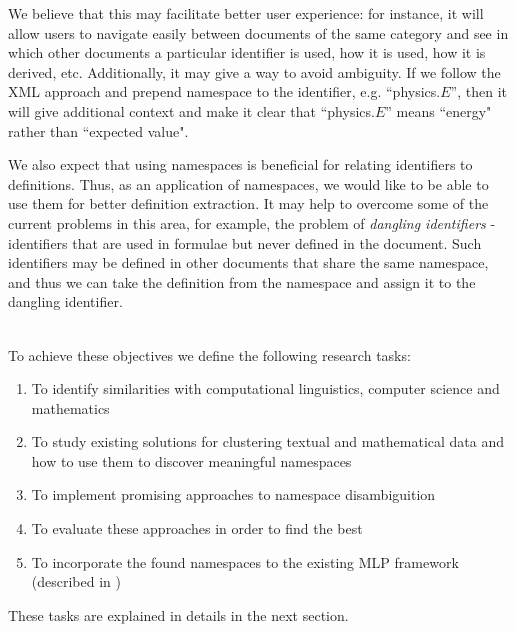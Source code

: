 \documentclass[12pt,a4paper]{article}
\begin{document}
We believe that this may facilitate better user experience: for instance, it will allow users to navigate easily between documents of the same category and see in which other documents a particular identifier is used, how it is used, how it is derived, etc. Additionally, it may give a way to avoid ambiguity. If we follow the XML approach \cite{source:xml_bray99} and prepend namespace to the identifier, e.g. ``physics.$E$'', then it will give additional context and make it clear that ``physics.$E$'' means ``energy" rather than ``expected value".

We also expect that using namespaces is beneficial for relating identifiers to definitions. Thus, as an application of namespaces, we would like to be able to use them for better definition extraction. It may help to overcome some of the current problems in this area, for example, the problem of \emph{dangling identifiers} \cite{source:mlpp} - identifiers that are used in formulae but never defined in the document. Such identifiers may be defined in other documents that share the same namespace, and thus we can take the definition from the namespace and assign it to the dangling identifier.



\ \\

To achieve these objectives we define the following research tasks:

\begin{enumerate}
\itemsep1pt\parskip0pt

  \item To identify similarities with computational linguistics, computer science and mathematics
  \item To study existing solutions for clustering textual and mathematical data and how to use them to discover meaningful namespaces
  \item To implement promising approaches to namespace disambiguition
  \item To evaluate these approaches in order to find the best
  \item To incorporate the found namespaces to the existing MLP framework (described in \cite{source:mlpp})
\end{enumerate}

These tasks are explained in details in the next section.
\end{document}
